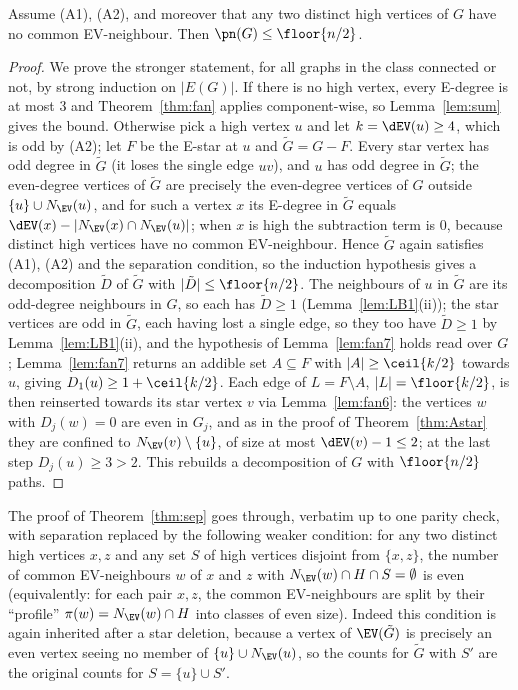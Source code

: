 \begin{theorem}\label{thm:sep}
Assume {\rm(A1)}, {\rm(A2)}, and moreover that any two distinct high vertices of
$G$ have no common EV-neighbour. Then $\pn(G)\le\floor{n/2}$.
\end{theorem}
\begin{proof}
We prove the stronger statement, for all graphs in the class connected or
not, by strong induction on $|E(G)|$. If there is no high vertex, every E-degree is at
most $3$ and Theorem~\ref{thm:fan} applies component-wise, so
Lemma~\ref{lem:sum} gives the bound. Otherwise pick a high vertex $u$ and let
$k=\dEV(u)\ge 4$, which is odd by {\rm(A2)}; let $F$ be the E-star at $u$ and
$\tilde G=G-F$. Every star vertex has odd degree in $\tilde G$ (it loses the
single edge $uv$), and $u$ has odd degree in $\tilde G$; the even-degree
vertices of $\tilde G$ are precisely the even-degree vertices of $G$ outside
$\{u\}\cup N_{\EV}(u)$, and for such a vertex $x$ its E-degree in $\tilde G$
equals $\dEV(x)-|N_{\EV}(x)\cap N_{\EV}(u)|$; when $x$ is high the subtraction
term is $0$, because distinct high vertices have no common EV-neighbour. Hence $\tilde G$
again satisfies {\rm(A1)}, {\rm(A2)} and the separation condition, so the
induction hypothesis gives a decomposition $\tilde D$ of $\tilde G$ with
$|\tilde D|\le\floor{n/2}$. The neighbours of $u$ in $\tilde G$ are its
odd-degree neighbours in $G$, so each has $\tilde D\ge 1$
(Lemma~\ref{lem:LB1}(ii)); the star vertices are odd in $\tilde G$, each having
lost a single edge, so they too have $\tilde D\ge1$ by
Lemma~\ref{lem:LB1}(ii), and the hypothesis of Lemma~\ref{lem:fan7} holds read
over $G$; Lemma~\ref{lem:fan7} returns an addible set
$A\subseteq F$ with $|A|\ge\ceil{k/2}$ towards $u$, giving
$D_1(u)\ge 1+\ceil{k/2}$. Each edge of $L=F\setminus A$, $|L|=\floor{k/2}$, is
then reinserted towards its star vertex $v$ via Lemma~\ref{lem:fan6}: the
vertices $w$ with $D_j(w)=0$ are even in $G_j$, and as in the proof of
Theorem~\ref{thm:Astar} they are confined to $N_{\EV}(v)\setminus\{u\}$, of
size at most $\dEV(v)-1\le 2$; at the last step $D_j(u)\ge 3>2$. This rebuilds
a decomposition of $G$ with $\floor{n/2}$ paths.
\end{proof}

\begin{remark}\label{rem:CO}
The proof of Theorem~\ref{thm:sep} goes through, verbatim up to one parity
check, with separation replaced by the following weaker condition: for any two
distinct high vertices $x,z$ and any set $S$ of high vertices disjoint from
$\{x,z\}$, the number of common EV-neighbours $w$ of $x$ and $z$ with
$N_{\EV}(w)\cap H\cap S=\emptyset$ is even (equivalently: for each pair $x,z$,
the common EV-neighbours are split by their ``profile'' $\pi(w)=N_{\EV}(w)\cap H$
into classes of even size). Indeed this condition is again inherited after a
star deletion, because a vertex of $\EV(\tilde G)$ is precisely an even vertex
seeing no member of $\{u\}\cup N_{\EV}(u)$, so the counts for $\tilde G$ with
$S'$ are the original counts for $S=\{u\}\cup S'$.
\end{remark}

